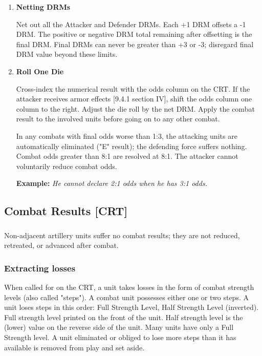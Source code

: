 \begin{enumerate}[label=\textbf{\Roman*.}]
    \item \textbf{Netting DRMs}
    
    Net out all the Attacker and Defender DRMs. Each +1 DRM offsets a -1 DRM. The positive or negative DRM total remaining after offsetting is the final DRM. Final DRMs can never be greater than +3 or -3; disregard final DRM value beyond these limits.
    
    \item \textbf{Roll One Die}
    
    Cross-index the numerical result with the odds column on the CRT. If the attacker receives armor effects [9.4.1 section IV], shift the odds column one column to the right. Adjust the die roll by the net DRM. Apply the combat result to the involved units before going on to any other combat.
    
    In any combats with final odds worse than 1:3, the attacking units are automatically eliminated ("E" result); the defending force suffers nothing. Combat odds greater than 8:1 are resolved at 8:1. The attacker cannot voluntarily reduce combat odds.
    
    \textbf{Example:} \textit{He cannot declare 2:1 odds when he has 3:1 odds.}
\end{enumerate}

\subsection{Combat Results [CRT]}
\subsubsection{}
Non-adjacent artillery units suffer no combat results; they are not reduced, retreated, or advanced after combat.

\subsubsection{\textbf{Extracting losses}}
When called for on the CRT, a unit takes losses in the form of combat strength levels (also called "steps"). A combat unit possesses either one or two steps. A unit loses steps in this order: Full Strength Level, Half Strength Level (inverted). Full strength level printed on the front of the unit. Half strength level is the (lower) value on the reverse side of the unit. Many units have only a Full Strength level. A unit eliminated or obliged to lose more steps than it has available is removed from play and set aside.

